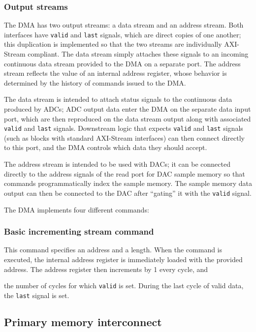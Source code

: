 \subsubsection{Output streams}

The DMA has two output streams: a data stream and an address stream. Both interfaces have \lstinline|valid| and \lstinline|last| signals, which are direct copies of one another; this duplication is implemented so that the two streams are individually AXI-Stream compliant. The data stream simply attaches these signals to an incoming continuous data stream provided to the DMA on a separate port. The address stream reflects the value of an internal address register, whose behavior is determined by the history of commands issued to the DMA. 

The data stream is intended to attach status signals to the continuous data produced by ADCs; ADC output data enter the DMA on the separate data input port, which are then reproduced on the data stream output along with associated \lstinline|valid| and \lstinline|last| signals. Downstream logic that expects \lstinline|valid| and \lstinline|last| signals (such as blocks with standard AXI-Stream interfaces) can then connect directly to this port, and the DMA controls which data they should accept. 

The address stream is intended to be used with DACs; it can be connected directly to the address signals of the read port for DAC sample memory so that commands programmatically index the sample memory. The sample memory data output can then be connected to the DAC after ``gating'' it with the \lstinline|valid| signal.

The DMA implements four different commands:

\subsubsection{Basic incrementing stream command}

This command specifies an address and a length. When the command is executed, the internal address register is immediately loaded with the provided address. The address register then increments by 1 every cycle, and 

the number of cycles for which \lstinline|valid| is set. During the last cycle of valid data, the \lstinline|last| signal is set.

\subsection{Primary memory interconnect} \label{sec_memory}



